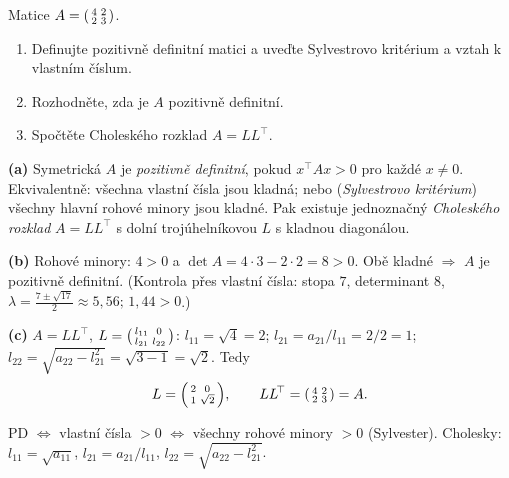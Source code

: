 \begin{zadani}
Matice $A=\begin{psmallmatrix}4&2\\2&3\end{psmallmatrix}$.
\begin{enumerate}[label=(\alph*)]
  \item {} Definujte pozitivně definitní matici a uveďte Sylvestrovo kritérium a vztah k vlastním číslum.
  \item {} Rozhodněte, zda je $A$ pozitivně definitní.
  \item {} Spočtěte Choleského rozklad $A=LL^{\!\top}$.
\end{enumerate}
\end{zadani}

\begin{reseni}
\textbf{(a)} Symetrická $A$ je \emph{pozitivně definitní}, pokud $x^{\!\top}Ax>0$ pro každé $x\neq0$. Ekvivalentně: všechna vlastní čísla jsou kladná; nebo (\emph{Sylvestrovo kritérium}) všechny hlavní rohové minory jsou kladné. Pak existuje jednoznačný \emph{Choleského rozklad} $A=LL^{\!\top}$ s dolní trojúhelníkovou $L$ s kladnou diagonálou.

\textbf{(b)} Rohové minory: $4>0$ a $\det A=4\cdot3-2\cdot2=8>0$. Obě kladné $\Rightarrow$ $A$ je pozitivně definitní. (Kontrola přes vlastní čísla: stopa $7$, determinant $8$, $\lambda=\tfrac{7\pm\sqrt{17}}{2}\approx5{,}56;\,1{,}44>0$.)

\textbf{(c)} $A=LL^{\!\top}$, $L=\begin{psmallmatrix}l_{11}&0\\l_{21}&l_{22}\end{psmallmatrix}$: $l_{11}=\sqrt{4}=2$; $l_{21}=a_{21}/l_{11}=2/2=1$; $l_{22}=\sqrt{a_{22}-l_{21}^2}=\sqrt{3-1}=\sqrt2$. Tedy
\[
L=\begin{psmallmatrix}2&0\\1&\sqrt2\end{psmallmatrix},\qquad LL^{\!\top}=\begin{psmallmatrix}4&2\\2&3\end{psmallmatrix}=A.
\]
\end{reseni}

\begin{jadro}
PD $\iff$ vlastní čísla $>0$ $\iff$ všechny rohové minory $>0$ (Sylvester). Cholesky: $l_{11}=\sqrt{a_{11}}$, $l_{21}=a_{21}/l_{11}$, $l_{22}=\sqrt{a_{22}-l_{21}^2}$.
\end{jadro}

